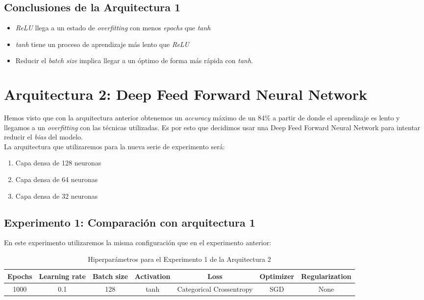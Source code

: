 \documentclass{article}
\begin{document}
		\subsection{Conclusiones de la Arquitectura 1}
			\begin{itemize}
				\item \textit{ReLU} llega a un estado de \textit{overfitting} con menos \textit{epochs} que \textit{tanh}
				\item \textit{tanh} tiene un proceso de aprendizaje m\'as lento que \textit{ReLU}
				\item Reducir el \textit{batch size} implica llegar a un \'optimo de forma m\'as r\'apida con \textit{tanh}.
			\end{itemize}
			
	\section{Arquitectura 2: Deep Feed Forward Neural Network}
		Hemos visto que con la arquitectura anterior obtenemos un \textit{accuracy} m\'aximo de un 84\% a partir de donde el aprendizaje es lento y llegamos a un \textit{overfitting} con las t\'ecnicas utilizadas. Es por esto que decidimos usar una Deep Feed Forward Neural Network para intentar reducir el \textit{bias} del modelo.\\
		La arquitectura que utilizaremos para la nueva serie de experimento ser\'a:
		
		\begin{enumerate}
			\item Capa densa de 128 neuronas
			\item Capa densa de 64 neuronas
			\item Capa densa de 32 neuronas
		\end{enumerate}
		
		\subsection{Experimento 1: Comparaci\'on con arquitectura 1}
		\label{s-a2-e1}
			En este experimento utilizaremos la misma configuraci\'on que en el experimento anterior:
			\begin{table}[!h]
				\begin{center}
					\begin{tabular}{| c | c | c | c | c | c | c |}
						\textbf{Epochs} & \textbf{Learning rate} & \textbf{Batch size} & \textbf{Activation} & \textbf{Loss} & \textbf{Optimizer} & \textbf{Regularization} \\ \hline
						1000 & 0.1 & 128 & tanh & Categorical Crossentropy & SGD & None
					\end{tabular}
					\caption{Hiperpar\'ametros para el Experimento 1 de la Arquitectura 2}
					\label{tab:hip-a2-e1}
				\end{center}
			\end{table}
			
\end{document}

